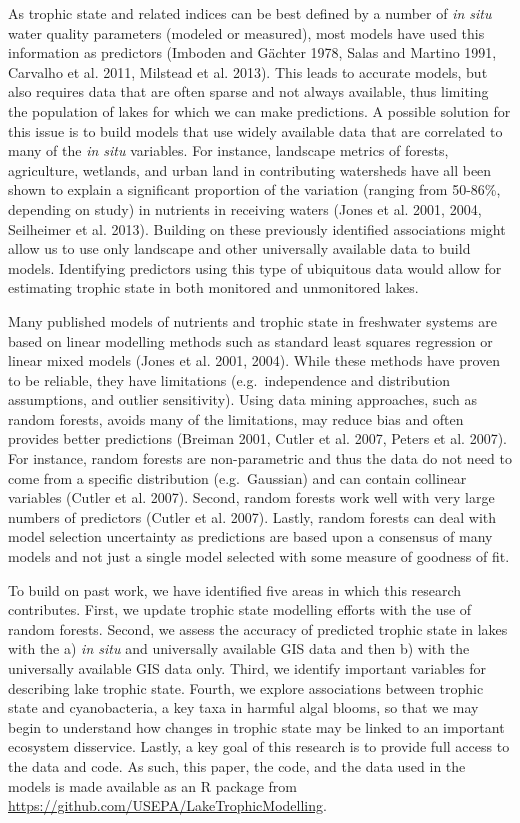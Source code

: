 \documentclass[11pt,]{article}
\begin{document}
As trophic state and related indices can be best defined by a number of
\emph{in situ} water quality parameters (modeled or measured), most
models have used this information as predictors (Imboden and G{ä}chter
1978, Salas and Martino 1991, Carvalho et al. 2011, Milstead et al.
2013). This leads to accurate models, but also requires data that are
often sparse and not always available, thus limiting the population of
lakes for which we can make predictions. A possible solution for this
issue is to build models that use widely available data that are
correlated to many of the \emph{in situ} variables. For instance,
landscape metrics of forests, agriculture, wetlands, and urban land in
contributing watersheds have all been shown to explain a significant
proportion of the variation (ranging from 50-86\%, depending on study)
in nutrients in receiving waters (Jones et al. 2001, 2004, Seilheimer et
al. 2013). Building on these previously identified associations might
allow us to use only landscape and other universally available data to
build models. Identifying predictors using this type of ubiquitous data
would allow for estimating trophic state in both monitored and
unmonitored lakes.

Many published models of nutrients and trophic state in freshwater
systems are based on linear modelling methods such as standard least
squares regression or linear mixed models (Jones et al. 2001, 2004).
While these methods have proven to be reliable, they have limitations
(e.g.~independence and distribution assumptions, and outlier
sensitivity). Using data mining approaches, such as random forests,
avoids many of the limitations, may reduce bias and often provides
better predictions (Breiman 2001, Cutler et al. 2007, Peters et al.
2007). For instance, random forests are non-parametric and thus the data
do not need to come from a specific distribution (e.g.~Gaussian) and can
contain collinear variables (Cutler et al. 2007). Second, random forests
work well with very large numbers of predictors (Cutler et al. 2007).
Lastly, random forests can deal with model selection uncertainty as
predictions are based upon a consensus of many models and not just a
single model selected with some measure of goodness of fit.

To build on past work, we have identified five areas in which this
research contributes. First, we update trophic state modelling efforts
with the use of random forests. Second, we assess the accuracy of
predicted trophic state in lakes with the a) \emph{in situ} and
universally available GIS data and then b) with the universally
available GIS data only. Third, we identify important variables for
describing lake trophic state. Fourth, we explore associations between
trophic state and cyanobacteria, a key taxa in harmful algal blooms, so
that we may begin to understand how changes in trophic state may be
linked to an important ecosystem disservice. Lastly, a key goal of this
research is to provide full access to the data and code. As such, this
paper, the code, and the data used in the models is made available as an
R package from \url{https://github.com/USEPA/LakeTrophicModelling}.
\end{document}
